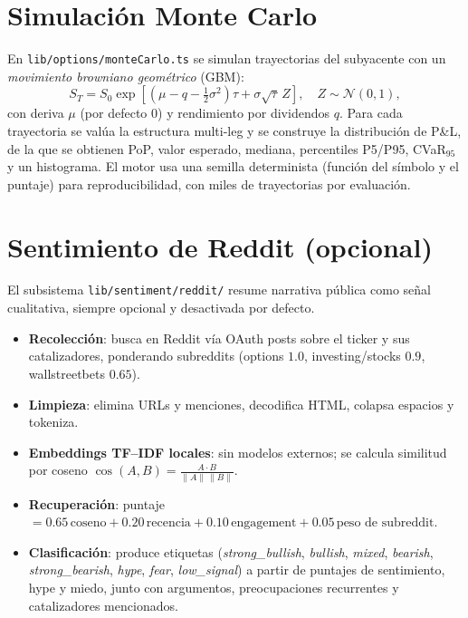 \documentclass[11pt,letterpaper]{article}
\begin{document}
\section{Simulación Monte Carlo}

En \texttt{lib/options/monteCarlo.ts} se simulan trayectorias del subyacente con
un \emph{movimiento browniano geométrico} (GBM):
\begin{equation}
S_T = S_0 \exp\!\left[\left(\mu - q - \tfrac{1}{2}\sigma^2\right)\tau + \sigma\sqrt{\tau}\,Z\right],
\quad Z\sim\mathcal{N}(0,1),
\end{equation}
con deriva $\mu$ (por defecto 0) y rendimiento por dividendos $q$. Para cada
trayectoria se valúa la estructura multi-leg y se construye la distribución de
P\&L, de la que se obtienen PoP, valor esperado, mediana, percentiles P5/P95,
CVaR$_{95}$ y un histograma. El motor usa una semilla determinista (función del
símbolo y el puntaje) para reproducibilidad, con miles de trayectorias por
evaluación.

\section{Sentimiento de Reddit (opcional)}

El subsistema \texttt{lib/sentiment/reddit/} resume narrativa pública como señal
cualitativa, siempre opcional y desactivada por defecto.

\begin{itemize}[noitemsep]
  \item \textbf{Recolección}: busca en Reddit vía OAuth posts sobre el ticker y
        sus catalizadores, ponderando subreddits (options $1.0$, investing/stocks
        $0.9$, wallstreetbets $0.65$).
  \item \textbf{Limpieza}: elimina URLs y menciones, decodifica HTML, colapsa
        espacios y tokeniza.
  \item \textbf{Embeddings TF--IDF locales}: sin modelos externos; se calcula
        similitud por coseno $\cos(A,B)=\frac{A\cdot B}{\lVert A\rVert\,\lVert B\rVert}$.
  \item \textbf{Recuperación}: puntaje $= 0.65\,\text{coseno} + 0.20\,\text{recencia} + 0.10\,\text{engagement} + 0.05\,\text{peso de subreddit}$.
  \item \textbf{Clasificación}: produce etiquetas (\emph{strong\_bullish},
        \emph{bullish}, \emph{mixed}, \emph{bearish}, \emph{strong\_bearish},
        \emph{hype}, \emph{fear}, \emph{low\_signal}) a partir de puntajes de
        sentimiento, hype y miedo, junto con argumentos, preocupaciones
        recurrentes y catalizadores mencionados.
\end{itemize}
\end{document}

